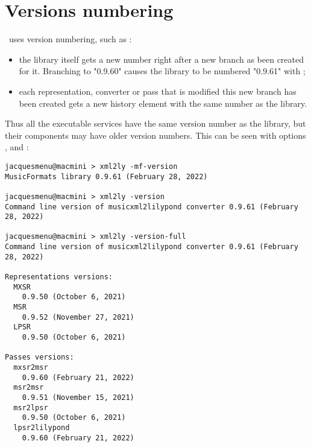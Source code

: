 



\chapter{Versions numbering}\label{Versions numbering}

\mf\ uses  version numbering, such as :%
\begin{itemize}
\item the library itself gets a new number right after a new branch as been created for it. Branching to "0.9.60" causes the library to be numbered "0.9.61" with ;

\item each representation, converter or pass that is modified this new branch has been created gets a new history element with the same number as the library.
\end{itemize}

Thus all the executable services have the same version number as the library, but their components may have older version numbers. This can be seen with options ,  and  :
\begin{lstlisting}[language=Terminal]%%%JMI do this again
jacquesmenu@macmini > xml2ly -mf-version
MusicFormats library 0.9.61 (February 28, 2022)

jacquesmenu@macmini > xml2ly -version
Command line version of musicxml2lilypond converter 0.9.61 (February 28, 2022)

jacquesmenu@macmini > xml2ly -version-full
Command line version of musicxml2lilypond converter 0.9.61 (February 28, 2022)

Representations versions:
  MXSR
    0.9.50 (October 6, 2021)
  MSR
    0.9.52 (November 27, 2021)
  LPSR
    0.9.50 (October 6, 2021)

Passes versions:
  mxsr2msr
    0.9.60 (February 21, 2022)
  msr2msr
    0.9.51 (November 15, 2021)
  msr2lpsr
    0.9.50 (October 6, 2021)
  lpsr2lilypond
    0.9.60 (February 21, 2022)
\end{lstlisting}
